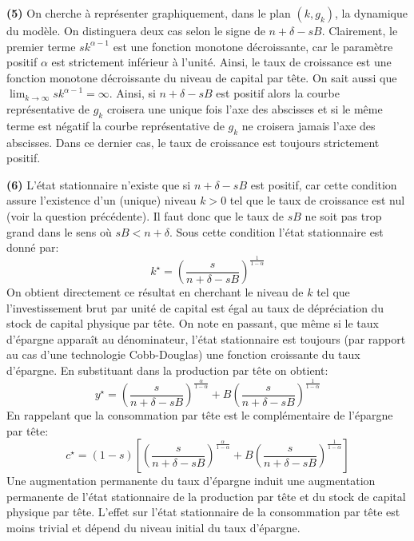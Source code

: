 \documentclass[10pt,a4paper,notitlepage]{article}
\newcommand{\question}[1]{\textbf{(#1)}}
\begin{document}
\question{5} On cherche à représenter graphiquement, dans le plan
$(k,g_k)$, la dynamique du modèle. On distinguera deux cas selon le
signe de $n+\delta-sB$. Clairement, le premier terme $sk^{\alpha-1}$
est une fonction monotone décroissante, car le paramètre positif
$\alpha$ est strictement inférieur à l'unité. Ainsi, le taux de
croissance est une fonction monotone décroissante du niveau de capital
par tête. On sait aussi que
$\lim_{k\rightarrow\infty}sk^{\alpha-1}=\infty$. Ainsi, si
$n+\delta-sB$ est positif alors la courbe représentative de $g_k$ croisera une
unique fois l'axe des abscisses et si le même terme est négatif la
courbe représentative de $g_k$ ne croisera jamais l'axe des
abscisses. Dans ce dernier cas, le taux de croissance est toujours
strictement positif.


\bigskip

\question{6} L'état stationnaire n'existe que si $n+\delta-sB$ est
positif, car cette condition assure l'existence d'un (unique) niveau
$k>0$ tel que le taux de croissance est nul (voir la question
précédente). Il faut donc que le taux de $sB$ ne soit pas trop grand
dans le sens où $sB<n+\delta$. Sous cette condition l'état
stationnaire est donné par:
\[
k^{\star} = \left(\frac{s}{n+\delta-sB}\right)^{\frac{1}{1-\alpha}}
\]
On obtient directement ce résultat en cherchant le niveau de $k$ tel
que l'investissement brut par unité de capital est égal au taux de
dépréciation du stock de capital physique par tête. On note en
passant, que même si le taux d'épargne apparaît au dénominateur,
l'état stationnaire est toujours (par rapport au cas d'une technologie
Cobb-Douglas) une fonction croissante du taux d'épargne. En
substituant dans la production par tête on obtient:
\[
y^{\star} = \left(\frac{s}{n+\delta-sB}\right)^{\frac{\alpha}{1-\alpha}}+B\left(\frac{s}{n+\delta-sB}\right)^{\frac{1}{1-\alpha}}
\]
En rappelant que la consommation par tête est le complémentaire de
l'épargne par tête:
\[
c^{\star} = (1-s)\left[\left(\frac{s}{n+\delta-sB}\right)^{\frac{\alpha}{1-\alpha}}+B\left(\frac{s}{n+\delta-sB}\right)^{\frac{1}{1-\alpha}}\right]
\]
Une augmentation permanente du taux d'épargne induit une augmentation
permanente de l'état stationnaire de la production par tête et du
stock de capital physique par tête. L'effet sur l'état stationnaire de
la consommation par tête est moins trivial et dépend du niveau initial
du taux d'épargne.\newline
\end{document}
